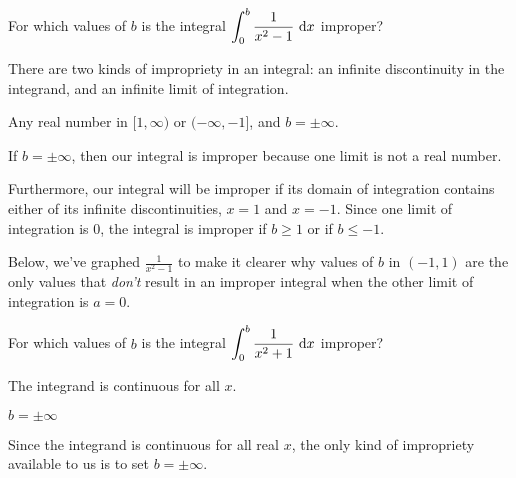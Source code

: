 %
%
\subsection*{\Conceptual}
\begin{Mquestion}
For which values of $b$ is the integral
$\displaystyle\int_0^b \frac{1}{x^2-1}~\mathrm{d}x$ improper?
\end{Mquestion}
\begin{hint}
There are two kinds of impropriety in an integral: an infinite discontinuity in the integrand, and an infinite limit of integration.
\end{hint}
\begin{answer}
Any real number in $[1,\infty)$ or $(-\infty,-1]$, and $b = \pm \infty$.
\end{answer}
\begin{solution}
If $ b= \pm \infty$, then our integral is improper because one limit is not a real number.

Furthermore, our integral will be improper if its domain of integration contains either of its infinite discontinuities, $x=1$ and $x=-1$. Since one limit of integration is 0, the integral is improper if $b \geq 1$ or if $b \leq -1$.

Below, we've graphed $\frac{1}{x^2-1}$ to make it clearer why values of $b$ in $(-1,1)$ are the only values that \emph{don't} result in an improper integral when the other limit of integration is $a=0$.

\begin{center}
\end{center}
\end{solution}
\begin{Mquestion}
For which values of $b$ is the integral
$\displaystyle\int_0^b \frac{1}{x^2+1}~\mathrm{d}x$ improper?
\end{Mquestion}
\begin{hint}
The integrand is continuous for all $x$.
\end{hint}
\begin{answer}
$b = \pm\infty$
\end{answer}
\begin{solution}
Since the integrand is continuous for all real $x$, the only kind of impropriety available to us is to set $b = \pm\infty$.
\end{solution}

